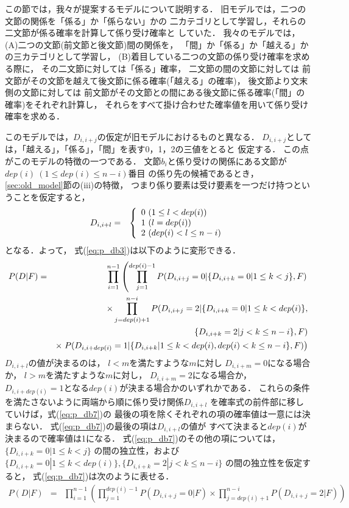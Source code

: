 この節では，我々が提案するモデルについて説明する．
旧モデルでは，二つの文節の関係を「係る」か「係らない」かの
二カテゴリとして学習し，それらの二文節が係る確率を計算して係り受け確率と
していた．
我々のモデルでは，(A)二つの文節(前文節と後文節)間の関係を，
「間」か「係る」か「越える」かの三カテゴリとして学習し，
(B)着目している二つの文節の係り受け確率を求める際に，
その二文節に対しては「係る」確率，
二文節の間の文節に対しては
前文節がその文節を越えて後文節に係る確率(「越える」の確率)，
後文節より文末側の文節に対しては
前文節がその文節との間にある後文節に係る確率(「間」の確率)をそれぞれ計算し，
それらをすべて掛け合わせた確率値を用いて係り受け確率を求める．

このモデルでは，$D_{i,i+j}$の仮定が旧モデルにおけるものと異なる．
$D_{i,i+j}$としては，「越える」，「係る」，「間」を表す0，1，2の三値をとると
仮定する．
この点がこのモデルの特徴の一つである．
文節$b_{i}$と係り受けの関係にある文節が$dep(i)\ (1\leq dep(i) \leq n-i)$番目
の係り先の候補であるとき，\ref{sec:old_model}節の(iii)の特徴，
つまり係り要素は受け要素を一つだけ持つということを仮定すると，
\begin{eqnarray*}
  D_{i,i+l} & = & 
  \left\{
    \begin{array}[c]{l}
      0\ (1\leq l< dep(i))\\
      1\ (l = dep(i))\\
      2\ (dep(i)< l\leq n-i)
    \end{array}
    \right.
\end{eqnarray*}
となる．よって，
式(\ref{eq:p_db3})は以下のように変形できる．
\begin{eqnarray}
  \label{eq:p_db7}
  P(D|F) & = & 
  \prod_{i=1}^{n-1}
  \left(\prod_{j=1}^{dep(i)-1} 
    P(D_{i,i+j}=0|\{D_{i,i+k}=0|1\leq k<j\},F)\right.\nonumber\\
  & &  \times \prod_{j=dep(i)+1}^{n-i}
  P(D_{i,i+j}=2|\{D_{i,i+k}=0|1\leq k<dep(i)\},\nonumber\\
  & &  \{D_{i,i+k}=2|j<k\leq n-i\},F) \nonumber\\
  & &  \times 
  \left.P(D_{i,i+dep(i)}=1|
    \{D_{i,i+k}|1\leq k<dep(i),dep(i)<k\leq n-i\},F)\right)\nonumber\\
\end{eqnarray}
$D_{i,i+l}$の値が決まるのは，
$l<m$を満たすような$m$に対し
$D_{i,i+m}=0$になる場合か，
$l>m$を満たすような$m$に対し，
$D_{i,i+m}=2$になる場合か，
$D_{i,i+dep(i)}=1$となる$dep(i)$が決まる場合かのいずれかである．
これらの条件を満たさないように両端から順に係り受け関係$D_{i,i+l}$
を確率式の前件部に移していけば，式(\ref{eq:p_db7})の
最後の項を除くそれぞれの項の確率値は一意には決まらない．
式(\ref{eq:p_db7})の最後の項は$D_{i,i+l}$の値が
すべて決まると$dep(i)$が決まるので確率値は1になる．
式(\ref{eq:p_db7})のその他の項については，
$\{D_{i,i+k}=0|1\leq k<j\}$ の間の独立性，および
$\{D_{i,i+k}=0|1\leq k<dep(i)\},\{D_{i,i+k}=2|j<k\leq n-i\}$ 
の間の独立性を仮定すると，
式(\ref{eq:p_db7})は次のように表せる．
\begin{eqnarray}
  \label{eq:p_db8}
  P(D|F) & = & 
  \prod_{i=1}^{n-1}
  \left(\prod_{j=1}^{dep(i)-1}P(D_{i,i+j}=0|F)
    \times \prod_{j=dep(i)+1}^{n-i}P(D_{i,i+j}=2|F)\right)
\end{eqnarray}

